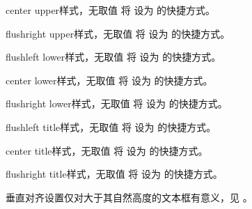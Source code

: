 \begin{docTcbKey}[][doc updated=2015-05-07]{center upper}{}{样式，无取值}
  将  设为  的快捷方式。
\end{docTcbKey}

\begin{docTcbKey}[][doc updated=2015-05-07]{flushright upper}{}{样式，无取值}
  将  设为  的快捷方式。
\end{docTcbKey}

\begin{docTcbKey}[][doc updated=2015-05-07]{flushleft lower}{}{样式，无取值}
  将  设为  的快捷方式。
\end{docTcbKey}

\begin{docTcbKey}[][doc updated=2015-05-07]{center lower}{}{样式，无取值}
  将  设为  的快捷方式。
\end{docTcbKey}

\begin{docTcbKey}[][doc updated=2015-05-07]{flushright lower}{}{样式，无取值}
  将  设为  的快捷方式。
\end{docTcbKey}

\clearpage

\begin{docTcbKey}[][doc updated=2015-05-07]{flushleft title}{}{样式，无取值}
  将  设为  的快捷方式。
\end{docTcbKey}

\begin{docTcbKey}[][doc updated=2015-05-07]{center title}{}{样式，无取值}
  将  设为  的快捷方式。
\end{docTcbKey}

\begin{docTcbKey}[][doc updated=2015-05-07]{flushright title}{}{样式，无取值}
  将  设为  的快捷方式。
\end{docTcbKey}


\begin{marker}
垂直对齐设置仅对大于其自然高度的文本框有意义，见 。
\end{marker}

